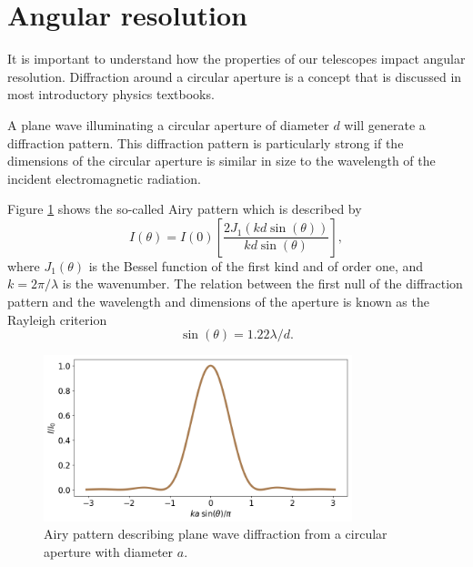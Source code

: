 \documentclass[a4paper,12pt]{article}
\theoremstyle{remark}
\renewcommand{\=}[1]{\stackrel{#1}{=}} %
\theoremstyle{plain}
\theoremstyle{definition}
\begin{document}
\section{Angular resolution}
It is important to understand how the properties of our telescopes impact angular resolution. Diffraction around a circular aperture is a concept that is discussed in most introductory physics textbooks. 

A plane wave illuminating a circular aperture of diameter $d$ will generate a diffraction pattern. This diffraction pattern is particularly strong if the dimensions of the circular aperture is similar in size to the wavelength of the incident electromagnetic radiation.

Figure \ref{fig:airy} shows the so-called Airy pattern which is described by 
\begin{equation}
I(\theta) = I(0) \left[ \frac{2J_1(kd\sin(\theta))}{kd\sin(\theta)} \right],
\end{equation}
where $J_1(\theta)$ is the Bessel function of the first kind and of order one, and $k = 2\pi/\lambda$ is the wavenumber. The relation between the first null of the diffraction pattern and the wavelength and dimensions of the aperture is known as the Rayleigh criterion
\begin{equation}
\sin (\theta) = 1.22 \lambda /d.
\end{equation}

\begin{figure}[t]
\begin{center}
    \includegraphics*[angle=0,width=0.8\textwidth]{img/airy_pattern.png}
    \caption[Insert text]{Airy pattern describing plane wave diffraction from a circular aperture with diameter $a$.}
\label{fig:airy}
\end{center}
\end{figure}
\end{document}
